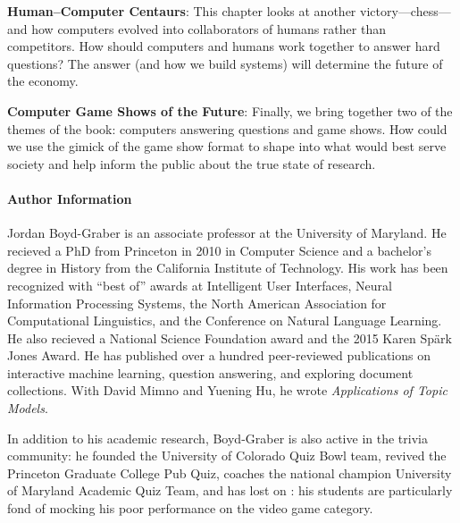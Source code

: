 \begin{enumerate}
\begin{enumerate*}
        \item {\bf Human--Computer Centaurs}: This chapter looks at
        another  victory---chess---and how computers evolved into
        collaborators of humans rather than competitors.  How should computers
        and humans work together to answer hard questions?  The answer (and
        how we build  systems) will determine the future of the
        economy.

        \item {\bf Computer Game Shows of the Future}: Finally, we bring
        together two of the themes of the book: computers answering questions
        and game shows.  How could we use the gimick of the game show format
        to shape  into what would best serve society and help inform the
        public about the true state of  research.

        \end{enumerate*}

\end{enumerate}

\paragraph{Author Information}

Jordan Boyd-Graber is an associate professor at the University of Maryland.
He recieved a PhD from Princeton in 2010 in Computer Science and a bachelor's
degree in History from the California Institute of Technology.
%
His work has been recognized with ``best of'' awards at Intelligent User
Interfaces, Neural Information Processing Systems, the North American
Association for Computational Linguistics, and the Conference on Natural
Language Learning.
%
He also recieved a National Science Foundation  award and the 2015
Karen Sp\"ark Jones Award.
%
He has published over a hundred peer-reviewed publications on interactive
machine learning, question answering, and exploring document collections.
%
With David Mimno and Yuening Hu, he wrote \emph{Applications of Topic Models}.

In addition to his academic research, Boyd-Graber is also active in the trivia
community: he founded the University of Colorado Quiz Bowl team, revived the
Princeton Graduate College Pub Quiz, coaches the national champion University
of Maryland Academic Quiz Team, and has lost on \jeopardyp{}: his
students are particularly fond of mocking his poor performance on the
video game category.

